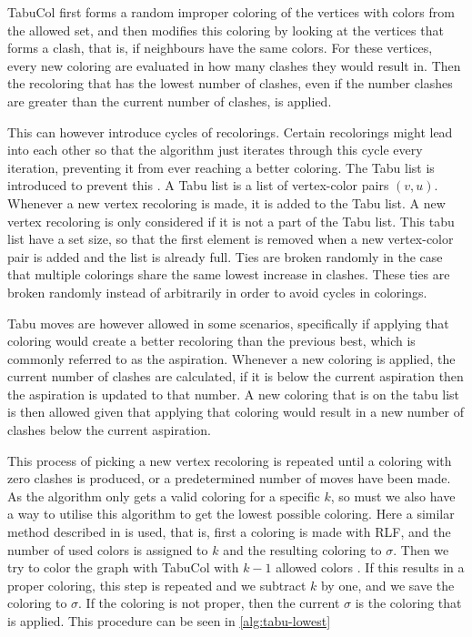 \documentclass[a4paper]{article}
\begin{document}
TabuCol first forms a random improper coloring of the vertices with colors from
the allowed set, and then modifies this coloring by looking at the vertices that
forms a clash, that is, if neighbours have the same colors. For these vertices,
every new coloring are evaluated in how many clashes they would result in. 
Then the recoloring that has the lowest number of clashes, even if the number
clashes are greater than the current number of clashes, is applied.

This can however introduce cycles of recolorings. Certain recolorings might
lead into each other so that the algorithm just iterates through this cycle
every iteration, preventing it from ever reaching a better coloring. The Tabu
list is introduced to prevent this . A Tabu list is a list of vertex-color
pairs $(v,u)$. Whenever a new vertex recoloring is made, it is added to the
Tabu list. A new vertex recoloring is only considered if it is not a part of
the Tabu list. This tabu list have a set size, so that the first element is
removed when a new vertex-color pair is added and the list is already full.
Ties are broken randomly in the case that multiple colorings share  the same
lowest increase in clashes. These ties are broken randomly instead of arbitrarily
in order to avoid cycles in colorings.

Tabu moves are however allowed in some scenarios, specifically if applying that
coloring would create a better recoloring than the previous best, which is
commonly referred to as the aspiration. Whenever a new coloring is applied, the
current number of clashes are calculated, if it is below the current
aspiration then the aspiration is updated to that number.  A new coloring that is
on the tabu list is then allowed given that applying that coloring would result
in a new number of clashes below the current aspiration.

This process of picking a new vertex recoloring is repeated until a coloring
with zero clashes is produced, or a predetermined number of moves have been
made. As the algorithm only gets a valid coloring for a specific $k$, so must
we also have a way to utilise this algorithm to get the lowest possible
coloring.  Here a similar method described in \cite{Constructive} is used, that
is, first a coloring is made with RLF, and the number of used colors is assigned
to $k$ and the resulting coloring to $\sigma$.  Then we try to color the
graph with TabuCol with $k-1$ allowed colors . If this results in a proper
coloring, this step is repeated and we subtract $k$ by one, and we save the
coloring to $\sigma$.  If the coloring is not proper, then the current $\sigma$
is the coloring that is applied.  This procedure can be seen in
\autoref{alg:tabu-lowest}
\end{document}
